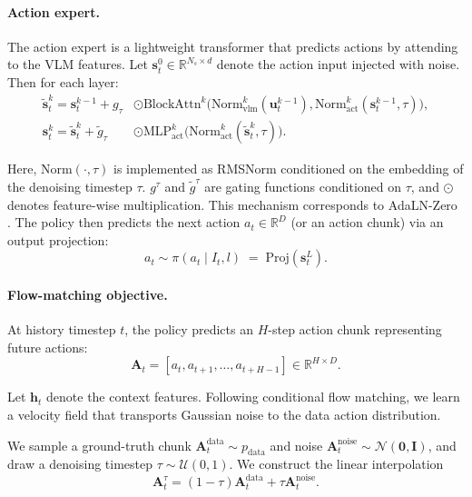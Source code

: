 \paragraph{Action expert.}
The action expert is a lightweight transformer that predicts actions by attending to the VLM features.
Let $\mathbf{s}_t^{0} \in \mathbb{R}^{N_s \times d}$ denote the action input injected with noise. Then for each layer:
\begin{align}
\tilde{\mathbf{s}}_t^{k} =
\mathbf{s}_t^{k-1} +
g_{\tau} &\odot 
\mathrm{BlockAttn}^{k}\!\big(
\mathrm{Norm}_\text{vlm}^{k}(\mathbf{u}_t^{k-1}),
\mathrm{Norm}_\text{act}^{k}(\mathbf{s}_t^{k-1}, \tau)
\big), 
\label{eq:act_attn}\\
\mathbf{s}_t^{k} =
\tilde{\mathbf{s}}_t^{k} +
\tilde{g}_{\tau} &\odot
\mathrm{MLP}_{\text{act}}^{k}\!\big(
\mathrm{Norm}_\text{act}^{k}(\tilde{\mathbf{s}}_t^{k}, \tau)
\big).
\label{eq:act_mlp}
\end{align}

Here, $\mathrm{Norm}(\cdot, \tau)$ is implemented as RMSNorm conditioned on the embedding of the denoising timestep $\tau$.
$g^\tau$ and $\tilde{g}^\tau$ are gating functions conditioned on $\tau$, and $\odot$ denotes feature-wise multiplication.
This mechanism corresponds to AdaLN-Zero \cite{peebles2023scalable}.
The policy then predicts the next action $a_t \in \mathbb{R}^{D}$ (or an action chunk) via an output projection:
\begin{equation}
a_t \sim \pi(a_t \mid I_t, l) \;=\; \mathrm{Proj}(\mathbf{s}_t^{L}).
\end{equation}

\paragraph{Flow-matching objective.}

At history timestep $t$, the policy predicts an $H$-step action chunk representing future actions:
\begin{equation}
\mathbf{A}_t = [a_t, a_{t+1}, \dots, a_{t+H-1}] \in \mathbb{R}^{H \times D}.
\end{equation}

Let $\mathbf{h}_t$ denote the context features. 
Following conditional flow matching, we learn a velocity field that transports Gaussian noise to the data action distribution.

We sample a ground-truth chunk
$\mathbf{A}_t^{\text{data}} \sim p_{\text{data}}$
and noise
$\mathbf{A}_t^{\text{noise}} \sim \mathcal{N}(\mathbf{0}, \mathbf{I})$,
and draw a denoising timestep $\tau \sim \mathcal{U}(0,1)$.
We construct the linear interpolation
\begin{equation}
\mathbf{A}_t^\tau
=
(1-\tau)\mathbf{A}_t^{\text{data}}
+
\tau \mathbf{A}_t^{\text{noise}} .
\end{equation}


